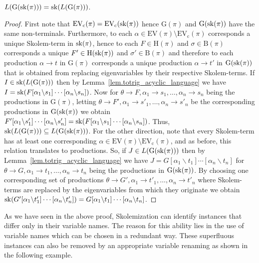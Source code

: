 \documentclass{LMCS}
\theoremstyle{plain}
\theoremstyle{definition}
\newcommand{\sop}{[}
\newcommand{\scl}{]}
\newcommand{\sel}[2]{#1 \backslash #2}
\newcommand{\unsubst}[2]{\sop \sel{#1}{#2} \scl}
\newcommand{\Lang}[1]{L(#1)}	\newcommand{\Gram}[1]{\mathrm{G}(#1)}	\newcommand{\Gramreg}[1]{\mathrm{G}_0(#1)}
\newcommand{\EV}{\mathrm{EV}}	\newcommand{\EVc}{\mathrm{EV_c}}	\newcommand{\Hseq}{\mathrm{H}}	\newcommand{\Bsub}{\mathrm{B}}	\newcommand{\terms}[1]{\mathrm{tm}(#1)}	\newcommand{\ev}[1]{\mathrm{ev}(#1)}	\newcommand{\cred}{\rightsquigarrow}	\newcommand{\credm}{\stackrel{\mathit{ne}}{\rightsquigarrow}}	\newcommand{\genrel}{\longrightarrow}
\begin{document}
\begin{lem}\label{lem.sk_LangGram_commute}
$\Lang{\Gram{\sk(\pi)}} = \sk(\Lang{\Gram{\pi}})$.
\end{lem}
\begin{proof}\sloppy
First note that $\EVc(\pi) = \EVc(\sk(\pi))$ hence $\Gram{\pi}$ and
$\Gram{\sk(\pi)}$ have the same non-terminals. Furthermore, to each
$\alpha\in\EV(\pi)\setminus\EVc(\pi)$ corresponds a unique Skolem-term
in $\mathrm{sk}(\pi)$, hence to each $F\in\Hseq(\pi)$ and $\sigma\in\Bsub(\pi)$ corresponds
a unique $F'\in\Hseq(\sk(\pi))$ and $\sigma'\in\Bsub(\pi)$ and therefore to
each production $\alpha\to t$ in $\Gram{\pi}$ corresponds a unique production
$\alpha\rightarrow t'$ in $\Gram{\sk(\pi)}$ that is obtained from replacing
eigenvariables by their respective Skolem-terms.
If $I \in \sk(\Lang{\Gram{\pi}})$ then by
Lemma~\ref{lem.totrig_acyclic_language} we have $I =
\sk(F\unsubst{\alpha_1}{s_1}\cdots\unsubst{\alpha_n}{s_n})$. Now for
$\theta\to F, \alpha_1\to s_1,\ldots,\alpha_n\to s_n$ being the
productions in $\Gram{\pi}$, letting $\theta \to F', \alpha_1\to
s'_1,\ldots,\alpha_n\to s'_n$ be the corresponding productions in
$\Gram{\sk(\pi)}$ we obtain
$F'\unsubst{\alpha_1}{s'_1}\cdots\unsubst{\alpha_n}{s'_n} =
\sk(F\unsubst{\alpha_1}{s_1}\cdots\unsubst{\alpha_n}{s_n})$. Thus,
$\sk(\Lang{\Gram{\pi}})\subseteq\Lang{\Gram{\sk(\pi)}}$.
For the other direction, note that every Skolem-term has at least one
corresponding $\alpha\in\EV(\pi)\setminus \EVc(\pi)$, and as before,
this relation translates to productions. So, if $J\in
\Lang{\Gram{\sk(\pi)}}$ then by
Lemma~\ref{lem.totrig_acyclic_language} we have $J =
G\unsubst{\alpha_1}{t_1}\cdots\unsubst{\alpha_n}{t_n}$ for $\theta
\to G, \alpha_1 \to t_1,\ldots, \alpha_n\to t_n$ being the productions
in $\Gram{\sk(\pi)}$.  By choosing one corresponding set of
productions $\theta\to G',\alpha_1\to t'_1,\ldots,\alpha_n\to t'_n$
where Skolem-terms are replaced by the eigenvariables from which they
originate we obtain
$\sk(G'\unsubst{\alpha_1}{t'_1}\cdots\unsubst{\alpha_n}{t'_n}) =
G\unsubst{\alpha_1}{t_1}\cdots\unsubst{\alpha_n}{t_n}$.
\end{proof}

As we have seen in the above proof, Skolemization can identify instances that
differ only in their variable names. The reason for this ability lies in the use
of variable names which can be chosen in a redundant way. These superfluous instances
can also be removed by an appropriate variable renaming as shown in the following
example.
\end{document}
